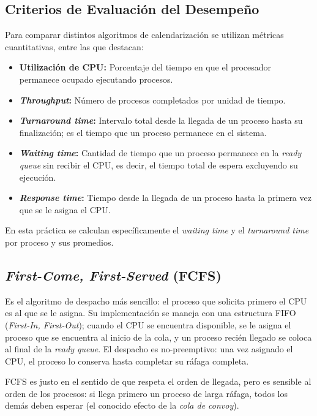 \documentclass[12pt]{article}
\begin{document}
    \subsection{Criterios de Evaluación del Desempeño}
    Para comparar distintos algoritmos de calendarización se utilizan métricas cuantitativas, entre las que destacan:
    \begin{itemize}
        \item \textbf{Utilización de CPU:} Porcentaje del tiempo en que el procesador permanece ocupado ejecutando procesos.
        \item \textbf{\textit{Throughput}:} Número de procesos completados por unidad de tiempo.
        \item \textbf{\textit{Turnaround time}:} Intervalo total desde la llegada de un proceso hasta su finalización; es el tiempo que un proceso permanece en el sistema.
        \item \textbf{\textit{Waiting time}:} Cantidad de tiempo que un proceso permanece en la \textit{ready queue} sin recibir el CPU, es decir, el tiempo total de espera excluyendo su ejecución.
        \item \textbf{\textit{Response time}:} Tiempo desde la llegada de un proceso hasta la primera vez que se le asigna el CPU.
    \end{itemize}
    En esta práctica se calculan específicamente el \textit{waiting time} y el \textit{turnaround time} por proceso y sus promedios.

    \subsection{\textit{First-Come, First-Served} (FCFS)}
    Es el algoritmo de despacho más sencillo: el proceso que solicita primero el CPU es al que se le asigna. Su implementación se maneja con una estructura FIFO (\textit{First-In, First-Out}); cuando el CPU se encuentra disponible, se le asigna el proceso que se encuentra al inicio de la cola, y un proceso recién llegado se coloca al final de la \textit{ready queue}. El despacho es no-preemptivo: una vez asignado el CPU, el proceso lo conserva hasta completar su ráfaga completa. \par
    FCFS es justo en el sentido de que respeta el orden de llegada, pero es sensible al orden de los procesos: si llega primero un proceso de larga ráfaga, todos los demás deben esperar (el conocido efecto de la \textit{cola de convoy}).
\end{document}
